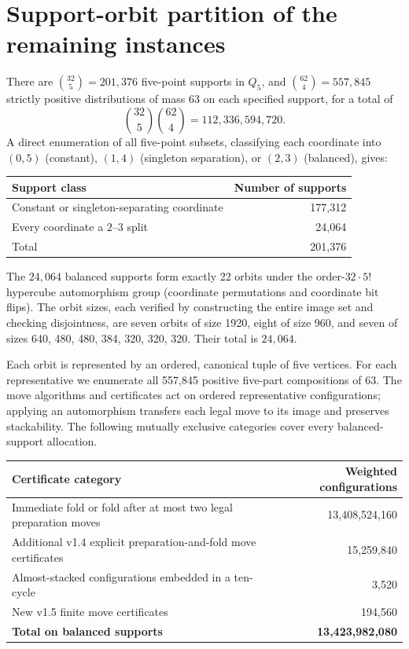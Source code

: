 \documentclass[11pt,a4paper]{article}
\begin{document}
\section{Support-orbit partition of the remaining instances}
There are $\binom{32}{5}=201{,}376$ five-point supports in $Q_5$, and $\binom{62}{4}=557{,}845$ strictly positive distributions of mass 63 on each specified support, for a total of
\[
\binom{32}{5}\binom{62}{4}=112{,}336{,}594{,}720.\tag{1}
\]
A direct enumeration of all five-point subsets, classifying each coordinate into $(0,5)$ (constant), $(1,4)$ (singleton separation), or $(2,3)$ (balanced), gives:
\begin{center}
\begin{tabular}{lr}
\toprule
Support class & Number of supports\\\midrule
Constant or singleton-separating coordinate & 177,312\\
Every coordinate a $2$--$3$ split & 24,064\\\midrule
Total & 201,376\\\bottomrule
\end{tabular}
\end{center}

The $24{,}064$ balanced supports form exactly 22 orbits under the order-$32\cdot5!$ hypercube automorphism group (coordinate permutations and coordinate bit flips). The orbit sizes, each verified by constructing the entire image set and checking disjointness, are seven orbits of size 1920, eight of size 960, and seven of sizes 640, 480, 480, 384, 320, 320, 320. Their total is $24{,}064$.

Each orbit is represented by an ordered, canonical tuple of five vertices. For each representative we enumerate all 557,845 positive five-part compositions of 63. The move algorithms and certificates act on ordered representative configurations; applying an automorphism transfers each legal move to its image and preserves stackability. The following mutually exclusive categories cover every balanced-support allocation.

\begin{center}\small
\begin{tabularx}{\linewidth}{Xr}
\toprule
Certificate category & Weighted configurations\\\midrule
Immediate fold or fold after at most two legal preparation moves & 13,408,524,160\\
Additional v1.4 explicit preparation-and-fold move certificates & 15,259,840\\
Almost-stacked configurations embedded in a ten-cycle & 3,520\\
New v1.5 finite move certificates & 194,560\\\midrule
\textbf{Total on balanced supports} & \textbf{13,423,982,080}\\\bottomrule
\end{tabularx}
\end{center}
\end{document}
